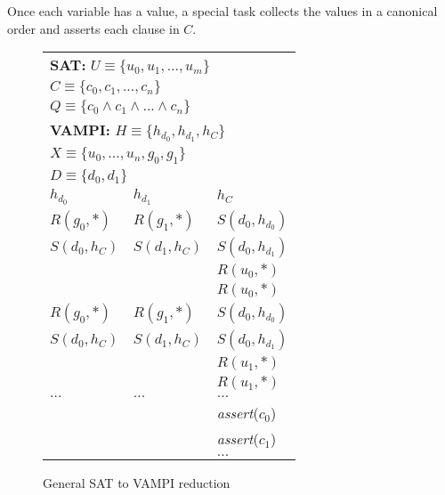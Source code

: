 Once each variable has a
value, a special task collects the values in a canonical order and
asserts each clause in $C$.

\begin{figure}
\begin{center}
\setlength{\tabcolsep}{2pt}
\begin{tabular}[t]{|l|l|l|}
\hline
\multicolumn{3}{|l|}{\textbf{SAT:} $\mathit{U\equiv\{u_0,u_1,...,u_m\}}$}\\
              \multicolumn{3}{|l|}{$\mathit{C\equiv\{c_0,c_1,...,c_n\}}$}\\
              \multicolumn{3}{|l|}{$\mathit{Q\equiv\{c_0\wedge c_1\wedge ...\wedge c_n\}}$}\\
\hline
\multicolumn{3}{|l|}{\textbf{VAMPI:} $\mathit{H\equiv\{h_{d_0},h_{d_1},h_{C}\}}$}\\
                \multicolumn{3}{|l|}{$\mathit{X\equiv\{u_0,...,u_n,g_0,g_1\}}$}\\
                \multicolumn{3}{|l|}{$\mathit{D\equiv\{d_0,d_1\}}$}\\
\hline
$h_{d_0}$ & $h_{d_1}$ & $h_C$ \\
\hline
$R(g_{0},*)$   & $R(g_{1},*)$   & $S(d_0,h_{d_0})$ \\
$S(d_{0},h_C)$ & $S(d_{1},h_C)$ & $S(d_0,h_{d_1})$ \\
              &                & $R(u_0,*)$        \\
              &                & $R(u_0,*)$        \\
\hline
$R(g_{0},*)$  &  $R(g_{1},*)$   & $S(d_0,h_{d_0})$ \\
$S(d_{0},h_C)$&  $S(d_{1},h_C)$ & $S(d_0,h_{d_1})$ \\
              &                & $R(u_1,*)$       \\
              &                & $R(u_1,*)$       \\
\hline
$\ldots$      &  $\ldots$      & $\ldots$                \\
\hline
              &                & \textit{assert}($c_0$) \\
              &                & \textit{assert}($c_1$) \\
              &                & $\ldots$ \\
\hline
\end{tabular}
\end{center}
\caption{General SAT to VAMPI reduction}
\label{fig:vampi}
\end{figure}
